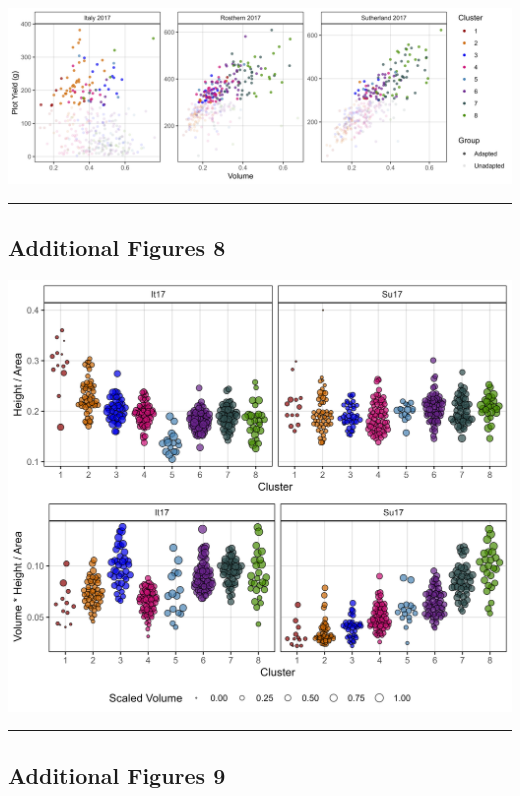 \documentclass[
]{article}
\begin{document}
\pagebreak

\includegraphics{Additional/Additional_Figure_07_1.png}

\begin{center}\rule{0.5\linewidth}{0.5pt}\end{center}

\subsection{Additional Figures 8}\label{additional-figures-8}

\includegraphics{Additional/Additional_Figure_08.png}

\begin{center}\rule{0.5\linewidth}{0.5pt}\end{center}

\subsection{Additional Figures 9}\label{additional-figures-9}
\end{document}
